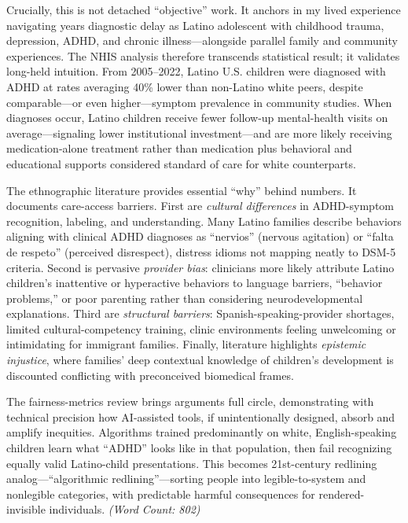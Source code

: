 \documentclass[11pt,twoside]{article}
\begin{document}
Crucially, this is not detached ``objective'' work. It anchors in my lived experience navigating years diagnostic delay as Latino adolescent with childhood trauma, depression, ADHD, and chronic illness---alongside parallel family and community experiences. The NHIS analysis therefore transcends statistical result; it validates long-held intuition. From 2005--2022, Latino U.S. children were diagnosed with ADHD at rates averaging 40\% lower than non-Latino white peers, despite comparable---or even higher---symptom prevalence in community studies. When diagnoses occur, Latino children receive fewer follow-up mental-health visits on average---signaling lower institutional investment---and are more likely receiving medication-alone treatment rather than medication plus behavioral and educational supports considered standard of care for white counterparts.

The ethnographic literature provides essential ``why'' behind numbers. It documents care-access barriers. First are \textit{cultural differences} in ADHD-symptom recognition, labeling, and understanding. Many Latino families describe behaviors aligning with clinical ADHD diagnoses as ``nervios'' (nervous agitation) or ``falta de respeto'' (perceived disrespect), distress idioms not mapping neatly to DSM-5 criteria. Second is pervasive \textit{provider bias}: clinicians more likely attribute Latino children's inattentive or hyperactive behaviors to language barriers, ``behavior problems,'' or poor parenting rather than considering neurodevelopmental explanations. Third are \textit{structural barriers}: Spanish-speaking-provider shortages, limited cultural-competency training, clinic environments feeling unwelcoming or intimidating for immigrant families. Finally, literature highlights \textit{epistemic injustice}, where families' deep contextual knowledge of children's development is discounted conflicting with preconceived biomedical frames.

The fairness-metrics review brings arguments full circle, demonstrating with technical precision how AI-assisted tools, if unintentionally designed, absorb and amplify inequities. Algorithms trained predominantly on white, English-speaking children learn what ``ADHD'' looks like in that population, then fail recognizing equally valid Latino-child presentations. This becomes 21st-century redlining analog---``algorithmic redlining''---sorting people into legible-to-system and nonlegible categories, with predictable harmful consequences for rendered-invisible individuals. \textit{(Word Count: 802)}
\end{document}
